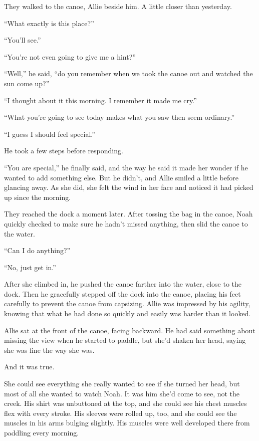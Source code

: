 \documentclass[10pt, twoside, openright]{book}
\begin{document}
They walked to the canoe, Allie beside him. A little closer than
yesterday.


``What exactly is this place?''

``You'll see.''

``You're not even going to give me a hint?''


``Well,'' he said, ``do you remember when we took the canoe out and
watched the sun come up?''


``I thought about it this morning. I remember it made me cry.''


``What you're going to see today makes what you saw then seem
ordinary.''


``I guess I should feel special.''

He took a few steps before responding.


``You are special,'' he finally said, and the way he said it made her
wonder if he wanted to add something else. But he didn't, and Allie
smiled a little before glancing away. As she did, she felt the wind in
her face and noticed it had picked up since the morning.

They reached the dock a moment later. After tossing the bag in the
canoe, Noah quickly checked to make sure he hadn't missed anything, then
slid the canoe to the water.


``Can I do anything?''

``No, just get in.''


After she climbed in, he pushed the canoe farther into the water, close
to the dock. Then he gracefully stepped off the dock into the canoe,
placing his feet carefully to prevent the canoe from capsizing. Allie
was impressed by his agility, knowing that what he had done so quickly
and easily was harder than it looked.

Allie sat at the front of the canoe, facing backward. He had said
something about missing the view when he started to paddle, but she'd
shaken her head, saying she was fine the way she was.


And it was true.


She could see everything she really wanted to see if she turned her
head, but most of all she wanted to watch Noah. It was him she'd come to
see, not the creek. His shirt was unbuttoned at the top, and she could
see his chest muscles flex with every stroke. His sleeves were rolled
up, too, and she could see the muscles in his arms bulging slightly. His
muscles were well developed there from paddling every morning.
\end{document}
